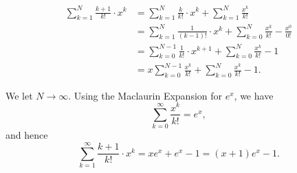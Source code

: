 \Question{\currfilebase}

\begin{align*}
    \sum_{k = 1}^{N} \frac{k + 1}{k!} \cdot x^k & = \sum_{k = 1}^{N} \frac{k}{k!} \cdot x^k + \sum_{k = 1}^{N} \frac{x^k}{k!}                        \\
                                                & = \sum_{k = 1}^{N} \frac{1}{(k - 1)!} \cdot x^k + \sum_{k = 0}^{N} \frac{x^k}{k!} - \frac{x^0}{0!} \\
                                                & = \sum_{k = 0}^{N - 1} \frac{1}{k!} \cdot x^{k + 1} + \sum_{k = 0}^{N} \frac{x^k}{k!} - 1          \\
                                                & = x \sum_{k = 0}^{N - 1} \frac{x^k}{k!} + \sum_{k = 0}^{N} \frac{x^k}{k!} - 1.
\end{align*}

We let \(N \to \infty\). Using the Maclaurin Expansion for \(e^x\), we have
\[
    \sum_{k = 0}^{\infty} \frac{x^k}{k!} = e^x,
\]
and hence
\[
    \sum_{k = 1}^{\infty} \frac{k + 1}{k!} \cdot x^k = x e^x + e^x - 1 = (x + 1) e^x - 1.
\]

